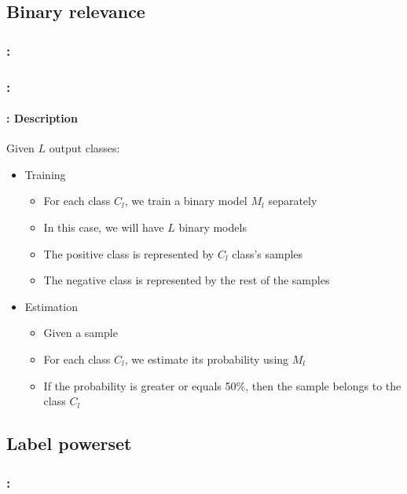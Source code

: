 \documentclass[xcolor=table]{beamer}
\begin{document}
\subsection{Binary relevance}

\begin{frame}
	\frametitle{\insertshortsubtitle: \insertsection}
	\framesubtitle{\insertsubsection}
	
	\begin{center}
	\end{center}
	
\end{frame}

\begin{frame}
	\frametitle{\insertshortsubtitle: \insertsection}
	\framesubtitle{\insertsubsection: Description}
	
	Given $L$ output classes:
	\begin{itemize}
		\item Training
		\begin{itemize}
			\item For each class $C_l$, we train a binary model $M_l$ separately
			\item In this case, we will have $L$ binary models
			\item The positive class is represented by $C_l$ class's samples
			\item The negative class is represented by the rest of the samples
		\end{itemize}
		\item Estimation
		\begin{itemize}
			\item Given a sample
			\item For each class $C_l$, we estimate its probability using $M_l$
			\item If the probability is greater or equals 50\%, then the sample belongs to the class $C_l$
		\end{itemize}
	\end{itemize}
	
\end{frame}

\subsection{Label powerset}

\begin{frame}
	\frametitle{\insertshortsubtitle: \insertsection}
	\framesubtitle{\insertsubsection}
	
	
\end{frame}
\end{document}
